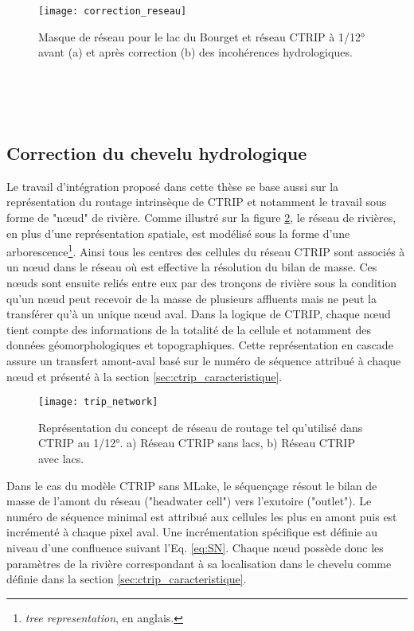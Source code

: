 \begin{figure}[h!]
\centering
       \texttt{[image: correction\_reseau]}
       \caption{Masque de réseau pour le lac du Bourget et réseau CTRIP à 1/12° avant (a) et après correction (b) des incohérences hydrologiques.}
     \label{correction_reseau}
\end{figure}

~\\
~\\
~\\

\subsection{{\selectfont Correction du chevelu hydrologique }}
\label{sec:chevelu}

Le travail d'intégration proposé dans cette thèse se base aussi sur la représentation du routage intrinsèque de CTRIP et notamment le travail sous forme de "nœud" de rivière. Comme illustré sur la figure \ref{algo_trip}, le réseau de rivières, en plus d'une représentation spatiale, est modélisé sous la forme d'une arborescence\footnote{\textit{tree representation}, en anglais.}. Ainsi tous les centres des cellules du réseau CTRIP sont associés à un nœud dans le réseau où est effective la résolution du bilan de masse. Ces nœuds sont ensuite reliés entre eux par des tronçons de rivière sous la condition qu'un nœud peut recevoir de la masse de plusieurs affluents mais ne peut la transférer qu'à un unique nœud aval. Dans la logique de CTRIP, chaque nœud tient compte des informations de la totalité de la cellule et notamment des données géomorphologiques et topographiques. Cette représentation en cascade assure un transfert amont-aval basé sur le numéro de séquence attribué à chaque nœud et présenté à la section \ref{sec:ctrip_caracteristique}. \\

\begin{figure}[h!]
\centering
       \texttt{[image: trip\_network]}
       \caption{Représentation du concept de réseau de routage tel qu'utilisé dans CTRIP au 1/12°. a) Réseau CTRIP sans lacs, b) Réseau CTRIP avec lacs.}
     \label{algo_trip}
\end{figure}

Dans le cas du modèle CTRIP sans MLake, le séquençage résout le bilan de masse  de l'amont du réseau ("headwater cell") vers l'exutoire ("outlet"). Le numéro de séquence minimal est attribué aux cellules les plus en amont puis est incrémenté à chaque pixel aval. Une incrémentation spécifique est définie au niveau d'une confluence suivant l'Eq. \ref{eq:SN}. Chaque nœud possède donc les paramètres de la rivière correspondant à sa localisation dans le chevelu comme définie dans la section \ref{sec:ctrip_caracteristique}.

